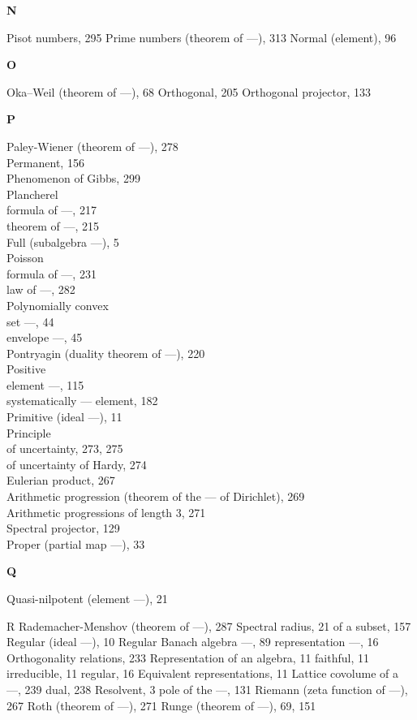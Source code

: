 \textbf{N}

Pisot numbers, 295 Prime numbers (theorem of ---), 313 Normal (element), 96

\textbf{O}

Oka--Weil (theorem of ---), 68 Orthogonal, 205 Orthogonal projector, 133

\textbf{P}

Paley-Wiener (theorem of ---), 278\\
Permanent, 156\\
Phenomenon of Gibbs, 299\\
Plancherel\\
formula of ---, 217\\
theorem of ---, 215\\
Full (subalgebra ---), 5\\
Poisson\\
formula of ---, 231\\
law of ---, 282\\
Polynomially convex\\
set ---, 44\\
envelope ---, 45\\
Pontryagin (duality theorem of ---), 220\\
Positive\\
element ---, 115\\
systematically --- element, 182\\
Primitive (ideal ---), 11\\
Principle\\
of uncertainty, 273, 275\\
of uncertainty of Hardy, 274\\
Eulerian product, 267\\
Arithmetic progression (theorem of the --- of Dirichlet), 269\\
Arithmetic progressions of length 3, 271\\
Spectral projector, 129\\
Proper (partial map ---), 33

\textbf{Q}

Quasi-nilpotent (element ---), 21

R Rademacher-Menshov (theorem of ---), 287 Spectral radius, 21 of a subset, 157 Regular (ideal ---), 10 Regular Banach algebra ---, 89 representation ---, 16 Orthogonality relations, 233 Representation of an algebra, 11 faithful, 11 irreducible, 11 regular, 16 Equivalent representations, 11 Lattice covolume of a ---, 239 dual, 238 Resolvent, 3 pole of the ---, 131 Riemann (zeta function of ---), 267 Roth (theorem of ---), 271 Runge (theorem of ---), 69, 151

